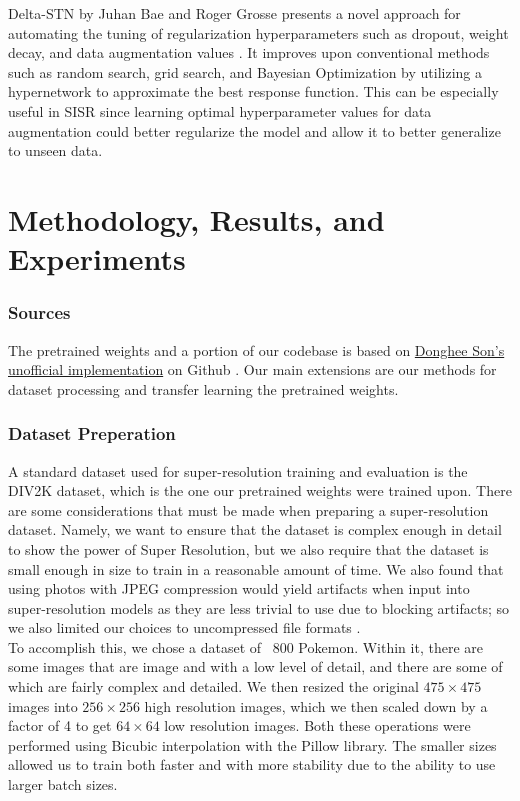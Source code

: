 \documentclass[11pt,titlepage]{article}
\begin{document}
\bigskip

Delta-STN by Juhan Bae and Roger Grosse presents a novel approach for automating the tuning of regularization hyperparameters such as dropout, weight decay, and data augmentation values \cite{Bae2020}. It improves upon conventional methods such as random search, grid search, and Bayesian Optimization by utilizing a hypernetwork to approximate the best response function. This can be especially useful in SISR since learning optimal hyperparameter values for data augmentation could better regularize the model and allow it to better generalize to unseen data.

\section*{Methodology, Results, and Experiments}
\subsubsection*{Sources}
The pretrained weights and a portion of our codebase is based on \href{https://github.com/dongheehand/SRGAN-PyTorch}{Donghee Son's unofficial implementation} on Github \cite{SonGitHub}. Our main extensions are our methods for dataset processing and transfer learning the pretrained weights. 

\subsubsection*{Dataset Preperation}
A standard dataset used for super-resolution training and evaluation is the DIV2K dataset, which is the one our pretrained weights were trained upon. There are some considerations that must be made when preparing a super-resolution dataset. Namely, we want to ensure that the dataset is complex enough in detail to show the power of Super Resolution, but we also require that the dataset is small enough in size to train in a reasonable amount of time. We also found that using photos with JPEG compression would yield artifacts when input into super-resolution models as they are less trivial to use due to blocking artifacts; so we also limited our choices to uncompressed file formats \cite{10.1007/978-3-319-95957-3_50}.\\

To accomplish this, we chose a dataset of ~800 Pokemon. Within it, there are some images that are image and with a low level of detail, and there are some of which are fairly complex and detailed. We then resized the original $475 \times 475$ images into $256 \times 256$ high resolution images, which we then scaled down by a factor of 4 to get $64 \times 64$ low resolution images. Both these operations were performed using Bicubic interpolation with the Pillow library. The smaller sizes allowed us to train both faster and with more stability due to the ability to use larger batch sizes.\\
\end{document}
